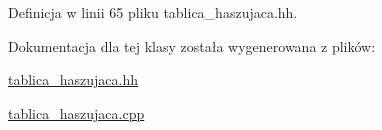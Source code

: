 \-Definicja w linii 65 pliku tablica\-\_\-haszujaca.\-hh.



\-Dokumentacja dla tej klasy została wygenerowana z plików\-:\begin{DoxyCompactItemize}
\item 
\hyperlink{tablica__haszujaca_8hh}{tablica\-\_\-haszujaca.\-hh}\item 
\hyperlink{tablica__haszujaca_8cpp}{tablica\-\_\-haszujaca.\-cpp}\end{DoxyCompactItemize}
